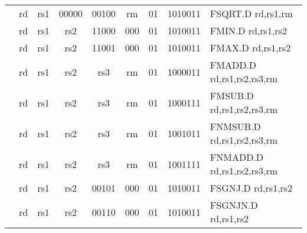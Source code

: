 \begin{table}[p]
\begin{small}
\begin{center}
\begin{tabular}{rccccccccccl}
&
\multicolumn{1}{|c|}{rd} &
\multicolumn{1}{c|}{rs1} &
\multicolumn{1}{c|}{00000} &
\multicolumn{3}{c|}{00100} &
\multicolumn{2}{c|}{rm} &
\multicolumn{1}{c|}{01} &
\multicolumn{1}{c|}{1010011} & FSQRT.D rd,rs1,rm \\
\cline{2-11}
  

&
\multicolumn{1}{|c|}{rd} &
\multicolumn{1}{c|}{rs1} &
\multicolumn{1}{c|}{rs2} &
\multicolumn{3}{c|}{11000} &
\multicolumn{2}{c|}{000} &
\multicolumn{1}{c|}{01} &
\multicolumn{1}{c|}{1010011} & FMIN.D rd,rs1,rs2 \\
\cline{2-11}
  

&
\multicolumn{1}{|c|}{rd} &
\multicolumn{1}{c|}{rs1} &
\multicolumn{1}{c|}{rs2} &
\multicolumn{3}{c|}{11001} &
\multicolumn{2}{c|}{000} &
\multicolumn{1}{c|}{01} &
\multicolumn{1}{c|}{1010011} & FMAX.D rd,rs1,rs2 \\
\cline{2-11}
  

&
\multicolumn{1}{|c|}{rd} &
\multicolumn{1}{c|}{rs1} &
\multicolumn{1}{c|}{rs2} &
\multicolumn{3}{c|}{rs3} &
\multicolumn{2}{c|}{rm} &
\multicolumn{1}{c|}{01} &
\multicolumn{1}{c|}{1000011} & FMADD.D rd,rs1,rs2,rs3,rm \\
\cline{2-11}
  

&
\multicolumn{1}{|c|}{rd} &
\multicolumn{1}{c|}{rs1} &
\multicolumn{1}{c|}{rs2} &
\multicolumn{3}{c|}{rs3} &
\multicolumn{2}{c|}{rm} &
\multicolumn{1}{c|}{01} &
\multicolumn{1}{c|}{1000111} & FMSUB.D rd,rs1,rs2,rs3,rm \\
\cline{2-11}
  

&
\multicolumn{1}{|c|}{rd} &
\multicolumn{1}{c|}{rs1} &
\multicolumn{1}{c|}{rs2} &
\multicolumn{3}{c|}{rs3} &
\multicolumn{2}{c|}{rm} &
\multicolumn{1}{c|}{01} &
\multicolumn{1}{c|}{1001011} & FNMSUB.D rd,rs1,rs2,rs3,rm \\
\cline{2-11}
  

&
\multicolumn{1}{|c|}{rd} &
\multicolumn{1}{c|}{rs1} &
\multicolumn{1}{c|}{rs2} &
\multicolumn{3}{c|}{rs3} &
\multicolumn{2}{c|}{rm} &
\multicolumn{1}{c|}{01} &
\multicolumn{1}{c|}{1001111} & FNMADD.D rd,rs1,rs2,rs3,rm \\
\cline{2-11}
  

&
\multicolumn{1}{|c|}{rd} &
\multicolumn{1}{c|}{rs1} &
\multicolumn{1}{c|}{rs2} &
\multicolumn{3}{c|}{00101} &
\multicolumn{2}{c|}{000} &
\multicolumn{1}{c|}{01} &
\multicolumn{1}{c|}{1010011} & FSGNJ.D rd,rs1,rs2 \\
\cline{2-11}
  

&
\multicolumn{1}{|c|}{rd} &
\multicolumn{1}{c|}{rs1} &
\multicolumn{1}{c|}{rs2} &
\multicolumn{3}{c|}{00110} &
\multicolumn{2}{c|}{000} &
\multicolumn{1}{c|}{01} &
\multicolumn{1}{c|}{1010011} & FSGNJN.D rd,rs1,rs2 \\
\cline{2-11}
  


\end{tabular}
\end{center}
\end{small}
\end{table}
